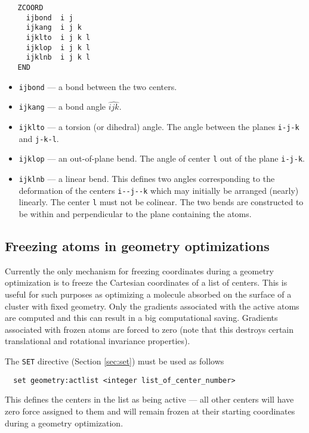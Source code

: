 \begin{verbatim}
   ZCOORD
     ijbond  i j
     ijkang  i j k
     ijklto  i j k l
     ijklop  i j k l
     ijklnb  i j k l
   END
\end{verbatim}

\begin{itemize}
\item {\tt ijbond} --- a bond between the two centers.
\item {\tt ijkang} --- a bond angle $\widehat{ijk}$.
\item {\tt ijklto} --- a torsion (or dihedral) angle.  The
  angle between the planes \verb+i-j-k+ and \verb+j-k-l+.
\item {\tt ijklop} --- an out-of-plane bend.  The angle of center
  \verb+l+ out of the plane \verb+i-j-k+.
\item {\tt ijklnb} --- a linear bend.  This defines two angles
  corresponding to the deformation of the centers \verb+i--j--k+ 
  which may initially be arranged (nearly) linearly.  The center
  \verb+l+ must not be colinear.  The two bends are constructed to be
  within and perpendicular to the plane containing the atoms.
\end{itemize}   

\subsection{Freezing atoms in geometry optimizations}
\label{sec:activeatoms}

Currently the only mechanism for freezing coordinates during a
geometry optimization is to freeze the Cartesian coordinates of a list
of centers.  This is useful for such purposes as optimizing a molecule
absorbed on the surface of a cluster with fixed geometry.  Only the
gradients associated with the active atoms are computed and this can
result in a big computational saving.  Gradients associated with
frozen atoms are forced to zero (note that this destroys certain
translational and rotational invariance properties).

The \verb+SET+ directive (Section \ref{sec:set}) must be used as
follows
\begin{verbatim}
  set geometry:actlist <integer list_of_center_number>
\end{verbatim}
This defines the centers in the list as being active --- all other
centers will have zero force assigned to them and will remain frozen
at their starting coordinates during a geometry optimization.

